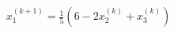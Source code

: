 \documentclass[preview]{standalone}
\begin{document}
\begin{align*}
x_1^{(k+1)} = \frac{1}{5} \left( 6 - 2x_2^{(k)} + x_3^{(k)} \right)
\end{align*}
\end{document}

